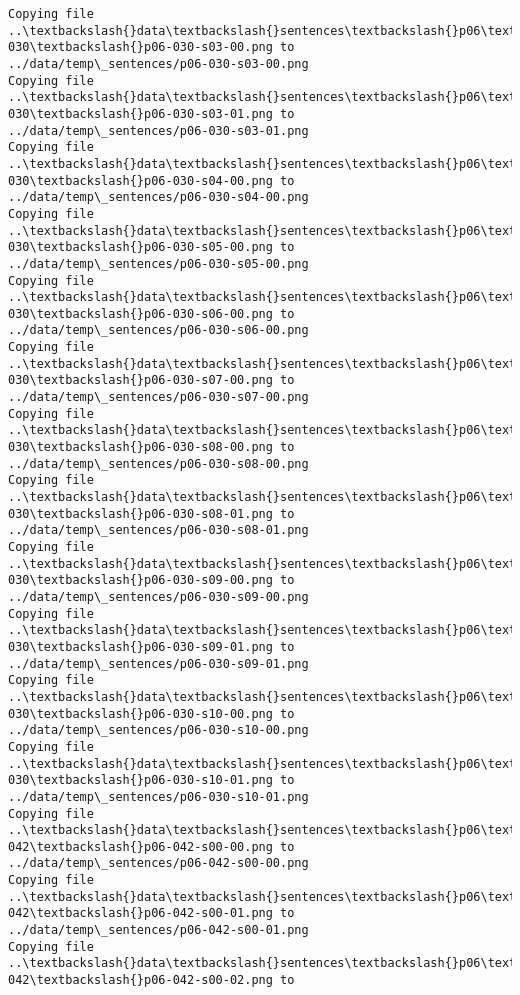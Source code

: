 \documentclass[11pt]{article}
\begin{document}
\begin{Verbatim}[commandchars=\\\{\}]
Copying file ..\textbackslash{}data\textbackslash{}sentences\textbackslash{}p06\textbackslash{}p06-030\textbackslash{}p06-030-s03-00.png to
../data/temp\_sentences/p06-030-s03-00.png
Copying file ..\textbackslash{}data\textbackslash{}sentences\textbackslash{}p06\textbackslash{}p06-030\textbackslash{}p06-030-s03-01.png to
../data/temp\_sentences/p06-030-s03-01.png
Copying file ..\textbackslash{}data\textbackslash{}sentences\textbackslash{}p06\textbackslash{}p06-030\textbackslash{}p06-030-s04-00.png to
../data/temp\_sentences/p06-030-s04-00.png
Copying file ..\textbackslash{}data\textbackslash{}sentences\textbackslash{}p06\textbackslash{}p06-030\textbackslash{}p06-030-s05-00.png to
../data/temp\_sentences/p06-030-s05-00.png
Copying file ..\textbackslash{}data\textbackslash{}sentences\textbackslash{}p06\textbackslash{}p06-030\textbackslash{}p06-030-s06-00.png to
../data/temp\_sentences/p06-030-s06-00.png
Copying file ..\textbackslash{}data\textbackslash{}sentences\textbackslash{}p06\textbackslash{}p06-030\textbackslash{}p06-030-s07-00.png to
../data/temp\_sentences/p06-030-s07-00.png
Copying file ..\textbackslash{}data\textbackslash{}sentences\textbackslash{}p06\textbackslash{}p06-030\textbackslash{}p06-030-s08-00.png to
../data/temp\_sentences/p06-030-s08-00.png
Copying file ..\textbackslash{}data\textbackslash{}sentences\textbackslash{}p06\textbackslash{}p06-030\textbackslash{}p06-030-s08-01.png to
../data/temp\_sentences/p06-030-s08-01.png
Copying file ..\textbackslash{}data\textbackslash{}sentences\textbackslash{}p06\textbackslash{}p06-030\textbackslash{}p06-030-s09-00.png to
../data/temp\_sentences/p06-030-s09-00.png
Copying file ..\textbackslash{}data\textbackslash{}sentences\textbackslash{}p06\textbackslash{}p06-030\textbackslash{}p06-030-s09-01.png to
../data/temp\_sentences/p06-030-s09-01.png
Copying file ..\textbackslash{}data\textbackslash{}sentences\textbackslash{}p06\textbackslash{}p06-030\textbackslash{}p06-030-s10-00.png to
../data/temp\_sentences/p06-030-s10-00.png
Copying file ..\textbackslash{}data\textbackslash{}sentences\textbackslash{}p06\textbackslash{}p06-030\textbackslash{}p06-030-s10-01.png to
../data/temp\_sentences/p06-030-s10-01.png
Copying file ..\textbackslash{}data\textbackslash{}sentences\textbackslash{}p06\textbackslash{}p06-042\textbackslash{}p06-042-s00-00.png to
../data/temp\_sentences/p06-042-s00-00.png
Copying file ..\textbackslash{}data\textbackslash{}sentences\textbackslash{}p06\textbackslash{}p06-042\textbackslash{}p06-042-s00-01.png to
../data/temp\_sentences/p06-042-s00-01.png
Copying file ..\textbackslash{}data\textbackslash{}sentences\textbackslash{}p06\textbackslash{}p06-042\textbackslash{}p06-042-s00-02.png to

\end{Verbatim}
\end{document}

